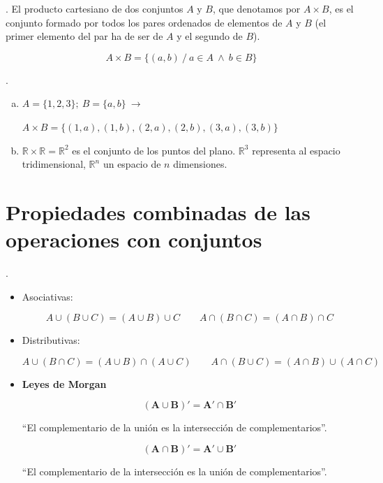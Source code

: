 \begin{definition}
	. El producto cartesiano de dos conjuntos $A \text{ y } B$, que denotamos por $A\times B$, es el conjunto formado por todos los pares ordenados de elementos de $A$ y $B$ (el primer elemento del par ha de ser de $A$ y el segundo de $B$).
	
	\vspace{-4mm} $$A\times B= \{(a,b) \ / \ a\in A \ \wedge \ b\in B \}$$	
\end{definition}

\begin{example}
	. \begin{enumerate}[a) ]
 		\item $A=\{1,2,3\};\ B=\{a,b\} \ \to $
 		
 		$A\times B = \{(1,a),(1,b),(2,a),(2,b),(3,a),(3,b)\}$
 		
 		\item $\mathbb R \times \mathbb R=\mathbb R^2$ es el conjunto de los puntos del plano. $\mathbb R^3$ representa al espacio tridimensional, $\mathbb R^n$ un espacio de $n$ dimensiones.
 	\end{enumerate}
\end{example}

\section[Propiedades combinadas de las operaciones con conjuntos]{Propiedades combinadas de las operaciones con conjuntos}

\begin{theorem}
	. \begin{itemize}
		\item Asociativas:
		
		\vspace{-5mm} $$A\cup(B\cup C)=(A\cup B)\cup C \qquad A\cap(B\cap C)=(A\cap B)\cap C$$
		
		\item Distributivas:
		
		\vspace{-5mm} $$A\cup(B\cap C)=(A\cup B)\cap (A\cup C) \qquad A\cap(B\cup C)=(A\cap B)\cup (A\cap C)$$
		
		\item \textbf{Leyes de Morgan}
		
		\vspace{-7mm} \begin{multicols}{2}

		\vspace{-5mm} $$\boldsymbol{ (A\cup B)'=A'\cap B'}$$
		
		``El complementario de la unión es la intersección de complementarios''.
		
		 \vspace{-5mm} $$\boldsymbol{ (A\cap B)'=A'\cup B' }$$
		
		``El complementario de la intersección es la unión de complementarios''.
	\end{multicols}	
		
   	\end{itemize}	
\end{theorem}

